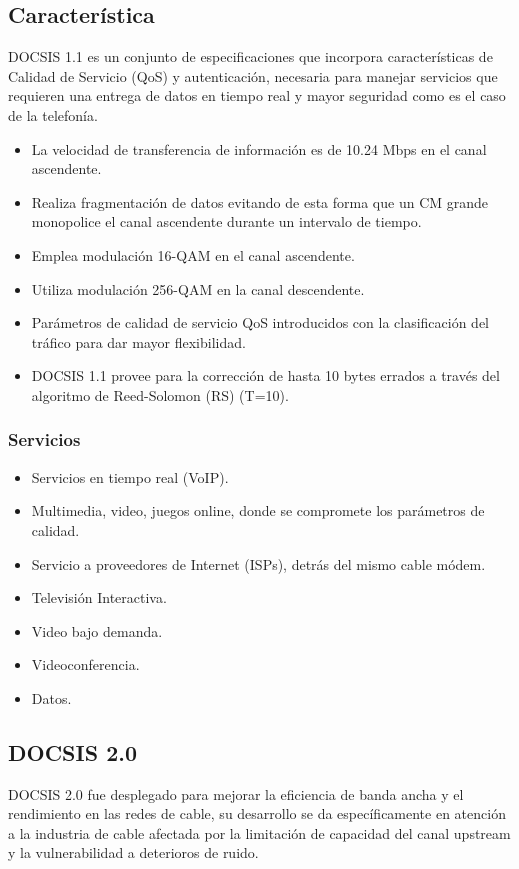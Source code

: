 \subsection*{Característica}
DOCSIS 1.1 es un conjunto de especificaciones que incorpora características de Calidad de Servicio (QoS) y autenticación, necesaria para manejar servicios que requieren una entrega de datos en tiempo real y mayor seguridad como es el caso de la telefonía.
\begin{itemize}
\item La velocidad de transferencia de información es de 10.24 Mbps en el canal ascendente.
\item Realiza fragmentación de datos evitando de esta forma que un CM grande monopolice el canal ascendente durante un intervalo de tiempo.
\item Emplea modulación 16-QAM en el canal ascendente. 
\item Utiliza modulación 256-QAM en la canal descendente.
\item Parámetros de calidad de servicio QoS introducidos con la clasificación del tráfico para dar mayor flexibilidad.
\item DOCSIS 1.1 provee para la corrección de hasta 10 bytes errados a través del algoritmo de Reed-Solomon (RS) (T=10).
\end{itemize}
\subsubsection*{Servicios}
\begin{itemize}
\item Servicios en tiempo real (VoIP).
\item Multimedia, video, juegos online, donde se compromete los parámetros de calidad.
\item Servicio a proveedores de Internet (ISPs), detrás del mismo cable módem.
\item Televisión Interactiva. 
\item Video bajo demanda. 
\item Videoconferencia. 
\item Datos.
\end{itemize}

\subsection*{DOCSIS 2.0}
DOCSIS 2.0 fue desplegado para mejorar la eficiencia de banda ancha y el rendimiento en las redes de cable, su desarrollo se da específicamente en atención a la industria de cable afectada por la limitación de capacidad del canal upstream y la vulnerabilidad a deterioros de ruido.
